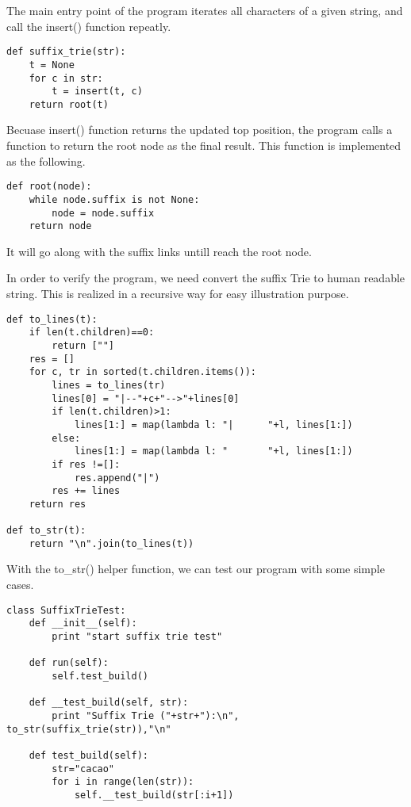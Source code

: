 \documentclass{article}
\begin{document}
The main entry point of the program iterates all characters of a given string, and 
call the insert() function repeatly.

\begin{lstlisting}
def suffix_trie(str):
    t = None
    for c in str:
        t = insert(t, c)
    return root(t)
\end{lstlisting}

Becuase insert() function returns the updated top position, the program calls
a function to return the root node as the final result. This function is implemented
as the following.

\begin{lstlisting}
def root(node):
    while node.suffix is not None:
        node = node.suffix
    return node
\end{lstlisting}

It will go along with the suffix links untill reach the root node.

In order to verify the program, we need convert the suffix Trie to human readable
string. This is realized in a recursive way for easy illustration purpose.

\begin{lstlisting}
def to_lines(t):
    if len(t.children)==0:
        return [""]
    res = []
    for c, tr in sorted(t.children.items()):
        lines = to_lines(tr)
        lines[0] = "|--"+c+"-->"+lines[0]
        if len(t.children)>1:
            lines[1:] = map(lambda l: "|      "+l, lines[1:])
        else:
            lines[1:] = map(lambda l: "       "+l, lines[1:])
        if res !=[]:
            res.append("|")
        res += lines
    return res

def to_str(t):
    return "\n".join(to_lines(t))
\end{lstlisting}

With the to\_str() helper function, we can test our program with
some simple cases.

\begin{lstlisting}
class SuffixTrieTest:
    def __init__(self):
        print "start suffix trie test"

    def run(self):
        self.test_build()

    def __test_build(self, str):
        print "Suffix Trie ("+str+"):\n", to_str(suffix_trie(str)),"\n"

    def test_build(self):
        str="cacao"
        for i in range(len(str)):
            self.__test_build(str[:i+1])
\end{lstlisting}
\end{document}
